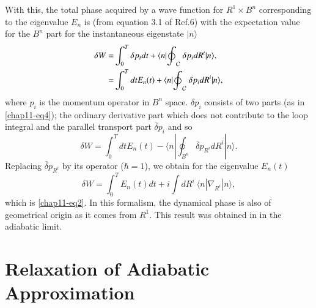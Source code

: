 With this, the total phase acquired by a wave function for $R^1\times B^n$ corresponding to the eigenvalue  $E_n$ is (from equation 3.1 of Ref.6) with the expectation value for the $B^n$ part for the instantaneous   eigenstate $|n\rangle $ 
\begin{align}
\delta W= &\int_0^T \delta p_t dt+\langle n|{\oint}_{\cal{C}}\ \delta p_i dR^i|n\rangle , \nonumber \\
= &\int_0^T dt E_n(t)+\langle n|{\oint}_{\cal{C}}\ \delta p_i dR^i|n\rangle,\label{chap11-eq6}
\end{align}
where $p_i$ is the momentum operator in $B^n$ space. $\delta p_i$ consists of two parts (as in \eqref{chap11-eq4}); the ordinary  derivative part which does not contribute to the loop integral and the parallel transport part $\bar{\delta}p_i$    and so 
\begin{equation}
\delta W= \int_0^Tdt E_n(t)-\langle n|{\oint}_{B^n}{\bar{\delta}}p_{R^i} dR^i|n\rangle.\label{chap11-eq7}
\end{equation}
Replacing ${\bar{\delta}}p_{R^i}$ by its operator ($\hbar=1$), we obtain for the eigenvalue $E_n(t)$
\begin{equation}
\delta W= \int_0^T E_n(t)dt+i\int dR^i\ \langle n|{\nabla}_{R^i}|n\rangle, \label{chap11-eq8}
\end{equation}
which is \eqref{chap11-eq2}. In this formalism, the dynamical phase is also of geometrical origin as it comes from $R^1$. This  result was obtained in \cite{chap11-key7} in the adiabatic limit. 

\section{Relaxation of Adiabatic Approximation}\label{chap11-sec4}

